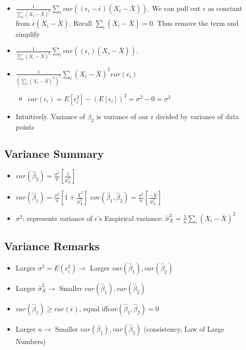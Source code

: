 \documentclass[10pt, oneside]{article}
\begin{document}
\begin{itemize}
\begin{itemize}
    \end{itemize}
    \item $\frac{1}{\sum_i (X_i -\bar X)^2}\sum_i var( (\epsilon_i -\bar \epsilon)(X_i -\bar X))$. We can pull out $\epsilon$ as constant from $\bar \epsilon(X_i - \bar X)$. Recall $\sum_i (X_i - \bar X)=0$. Thus remove the term and simplify
    \item $\frac{1}{\sum_i (X_i -\bar X)^2}\sum_i var( (\epsilon_i)(X_i -\bar X))$.
    \item $\frac{1}{(\sum_i (X_i -\bar X)^2)^2} \sum_i (X_i -\bar X) ^2 var(\epsilon_i)$
    \begin{itemize}
        \item $var(\epsilon_i) = E[\epsilon_i^2] - (E[\epsilon_i])^2 = \sigma^2 - 0 =\sigma^2$
    \end{itemize}
    \item Intuitively. Variance of $\beta_2$ is variance of our $\epsilon$ divided by variance of data points
\end{itemize}

\subsection{Variance Summary}
\begin{itemize}
    \item $var(\hat \beta_2) = \frac{\sigma^2}{n} \left[\frac{1}{\hat \sigma^2 _X}\right]$
    \item $var(\hat \beta_1 ) = \frac{\sigma^2}{n}\left[1+\frac{\bar X^2}{\hat \sigma^2 _X}\right]$
    $cov(\hat \beta_1 ,\hat \beta_2) = \frac{\sigma^2}{n}\left[\frac{-\bar X}{\hat \sigma^2 _X}\right]$
    \item $\sigma^2$: represents variance of $\epsilon$'s
    Empirical variance: $\hat \sigma^2_X  = \frac{1}{n} \sum_i (X_i -\bar X)^2$
    \end{itemize}

\subsection{Variance Remarks}
\begin{itemize}
    \item Larger $\sigma^2 = E(\epsilon_i ^2) \rightarrow $ Larger $var(\hat \beta_1), var(\hat \beta_2)$
    \item Larger $\hat \sigma^2 _X \rightarrow $ Smaller $var(\hat \beta_1), var(\hat \beta_2)$
    \item $var(\hat \beta_1) \geq var(\bar \epsilon)$, equal iff$cov(\hat \beta_1, \hat \beta_2) =0$
    \item Larger $n\rightarrow $ Smaller $var(\bar \beta_1), var(\hat \beta_2)$ (consistency, Law of Large Numbers)
\end{itemize}
\end{document}
